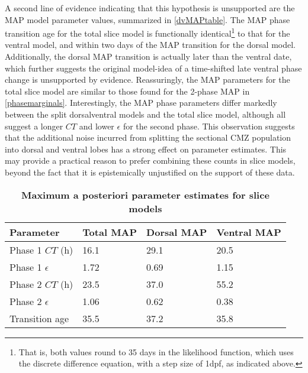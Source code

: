 A second line of evidence indicating that this hypothesis is unsupported are the MAP model parameter values, summarized in \autoref{dvMAPtable}. The MAP phase transition age for the total slice model is functionally identical\footnote{That is, both values round to 35 days in the likelihood function, which uses the discrete difference equation, with a step size of 1dpf, as indicated above.} to that for the ventral model, and within two days of the MAP transition for the dorsal model. Additionally, the dorsal MAP transition is actually later than the ventral date, which further suggests the original model-idea of a time-shifted late ventral phase change is unsupported by evidence. Reassuringly, the MAP parameters for the total slice model are similar to those found for the 2-phase MAP in \autoref{phasemarginals}. Interestingly, the MAP phase parameters differ markedly between the split dorsal\/ventral models and the total slice model, although all suggest a longer $CT$ and lower $\epsilon$ for the second phase. This observation suggests that the additional noise incurred from splitting the sectional CMZ population into dorsal and ventral lobes has a strong effect on parameter estimates. This may provide a practical reason to prefer combining these counts in slice models, beyond the fact that it is epistemically unjustified on the support of these data. 

\begin{table}[!ht]
    \centering
    \caption{{\bf Maximum a posteriori parameter estimates for slice models}}
    \begin{tabular}{|l|l|l|l|}
        \hline
        {\bf Parameter} & {\bf Total MAP} & {\bf Dorsal MAP} & {\bf Ventral MAP}\\ \hline
        Phase 1 $CT$ (h) & 16.1 & 29.1 & 20.5\\ \hline
        Phase 1 $\epsilon$ & 1.72 & 0.69 & 1.15\\ \hline
        Phase 2 $CT$ (h) & 23.5 & 37.0 & 55.2\\ \hline
        Phase 2 $\epsilon$ & 1.06 & 0.62 & 0.38\\ \hline
        Transition age & 35.5 & 37.2 & 35.8\\ \hline
        \end{tabular}
    \begin{flushleft} 
    \end{flushleft}
    \label{dvMAPtable}
\end{table}

